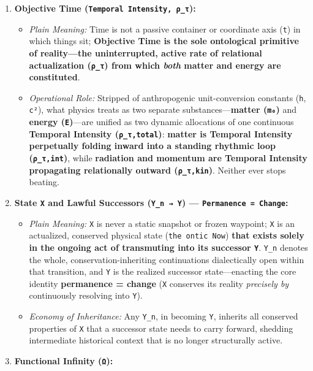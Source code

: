 \documentclass[
]{article}
\begin{document}
\begin{enumerate}
\def\labelenumi{\arabic{enumi}.}
\item
  \textbf{Objective Time (\texttt{Temporal~Intensity,~ρ\_τ}):}

  \begin{itemize}
  \item
    \emph{Plain Meaning:} Time is not a passive container or coordinate
    axis (\texttt{t}) in which things sit; \textbf{Objective Time is the
    sole ontological primitive of reality---the uninterrupted, active
    rate of relational actualization (\texttt{ρ\_τ}) from which
    \emph{both} matter and energy are constituted}.
  \item
    \emph{Operational Role:} Stripped of anthropogenic unit-conversion
    constants (\texttt{h}, \texttt{c²}), what physics treats as two
    separate substances---\textbf{matter (\texttt{m₀})} and
    \textbf{energy (\texttt{E})}---are unified as two dynamic
    allocations of one continuous \textbf{Temporal Intensity
    (\texttt{ρ\_τ,total})}: \textbf{matter is Temporal Intensity
    perpetually folding inward into a standing rhythmic loop
    (\texttt{ρ\_τ,int})}, while \textbf{radiation and momentum are
    Temporal Intensity propagating relationally outward
    (\texttt{ρ\_τ,kin})}. Neither ever stops beating.
  \end{itemize}
\item
  \textbf{State \texttt{X} and Lawful Successors
  (\texttt{\textquotesingle{}Y\_n~→~Y}) ---
  \texttt{Permanence~=~Change}:}

  \begin{itemize}
  \item
    \emph{Plain Meaning:} \texttt{X} is never a static snapshot or
    frozen waypoint; \texttt{X} is an actualized, conserved physical
    state (\texttt{the~ontic~Now}) \textbf{that exists solely in the
    ongoing act of transmuting into its successor \texttt{Y}}.
    \texttt{\textquotesingle{}Y\_n} denotes the whole,
    conservation-inheriting continuations dialectically open within that
    transition, and \texttt{Y} is the realized successor
    state---enacting the core identity \textbf{permanence = change}
    (\texttt{X} conserves its reality \emph{precisely by} continuously
    resolving into \texttt{Y}).
  \item
    \emph{Economy of Inheritance:} Any \texttt{\textquotesingle{}Y\_n},
    in becoming \texttt{Y}, inherits all conserved properties of
    \texttt{X} that a successor state needs to carry forward, shedding
    intermediate historical context that is no longer structurally
    active.
  \end{itemize}
\item
  \textbf{Functional Infinity (\texttt{Ω}):}


\end{enumerate}
\end{document}

